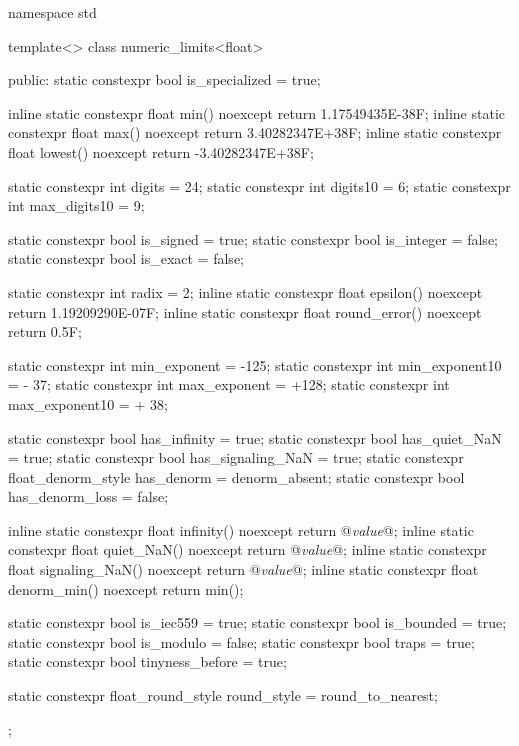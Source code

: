 \pnum
\enterexample
\begin{codeblock}
namespace std {
  template<> class numeric_limits<float> {
  public:
    static constexpr bool is_specialized = true;

    inline static constexpr float min() noexcept { return 1.17549435E-38F; }
    inline static constexpr float max() noexcept { return 3.40282347E+38F; }
    inline static constexpr float lowest() noexcept { return -3.40282347E+38F; }

    static constexpr int digits   = 24;
    static constexpr int digits10 =  6;
    static constexpr int max_digits10 =  9;

    static constexpr bool is_signed  = true;
    static constexpr bool is_integer = false;
    static constexpr bool is_exact   = false;

    static constexpr int radix = 2;
    inline static constexpr float epsilon() noexcept     { return 1.19209290E-07F; }
    inline static constexpr float round_error() noexcept { return 0.5F; }

    static constexpr int min_exponent   = -125;
    static constexpr int min_exponent10 = - 37;
    static constexpr int max_exponent   = +128;
    static constexpr int max_exponent10 = + 38;

    static constexpr bool has_infinity             = true;
    static constexpr bool has_quiet_NaN            = true;
    static constexpr bool has_signaling_NaN        = true;
    static constexpr float_denorm_style has_denorm = denorm_absent;
    static constexpr bool has_denorm_loss          = false;

    inline static constexpr float infinity()      noexcept { return @\textit{value}@; }
    inline static constexpr float quiet_NaN()     noexcept { return @\textit{value}@; }
    inline static constexpr float signaling_NaN() noexcept { return @\textit{value}@; }
    inline static constexpr float denorm_min()    noexcept { return min(); }

    static constexpr bool is_iec559  = true;
    static constexpr bool is_bounded = true;
    static constexpr bool is_modulo  = false;
    static constexpr bool traps      = true;
    static constexpr bool tinyness_before = true;

    static constexpr float_round_style round_style = round_to_nearest;
  };
}
\end{codeblock}
\exitexample

